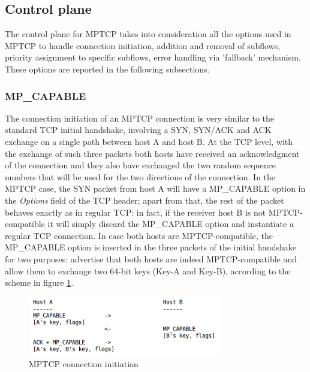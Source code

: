 \subsection{Control plane}
The control plane for MPTCP takes into consideration all the options used in MPTCP to handle connection initiation, addition and removal of subflows, priority assignment to specific subflows, error handling via 'fallback' mechanism. These options are reported in the following subsections.

\subsubsection{MP\_CAPABLE}
The connection initiation of an MPTCP connection is very similar to the standard TCP initial handshake, involving a SYN, SYN/ACK and ACK exchange on a single path between host A and host B. At the TCP level, with the exchange of such three packets both hosts have received an acknowledgment of the connection and they also have exchanged the two random sequence numbers that will be used for the two directions of the connection.
In the MPTCP case, the SYN packet from host A will have a MP\_CAPABLE option in the \textit{Options} field of the TCP header; apart from that, the rest of the packet behaves exactly as in regular TCP: in fact, if the receiver host B is not MPTCP-compatible it will simply discard the MP\_CAPABLE option and instantiate a regular TCP connection.
In case both hosts are MPTCP-compatible, the MP\_CAPABLE option is inserted in the three packets of the initial handshake for two purposes: advertise that both hosts are indeed MPTCP-compatible and allow them to exchange two 64-bit keys (Key-A and Key-B), according to the scheme in figure \ref{fig:mpcapable}.

\begin{figure}[!htb]
\centering
\includegraphics[width=0.75\textwidth]{images/mpcapable}
\caption{MPTCP connection initiation}
\label{fig:mpcapable}
\end{figure}

